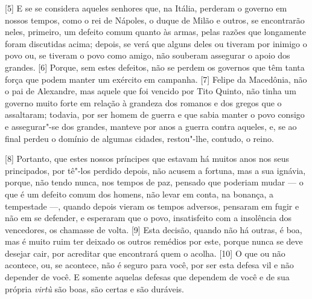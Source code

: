 {[}5{]} E se se considera aqueles senhores que, na Itália, perderam o
governo em nossos tempos, como o rei de Nápoles, o duque de Milão e outros,
se encontrarão neles, primeiro, um defeito comum quanto às armas, pelas
razões que longamente foram discutidas acima; depois, se verá que alguns
deles ou tiveram por inimigo o povo ou, se tiveram o povo como amigo,
não souberam assegurar o apoio dos grandes. {[}6{]} Porque, sem estes
defeitos, não se perdem os governos que têm tanta força que podem manter
um exército em campanha. {[}7{]} Felipe da Macedônia, não o pai de Alexandre, mas aquele que foi vencido por
Tito Quinto, não tinha um governo muito forte em relação à grandeza dos
romanos e dos gregos que o assaltaram; todavia, por ser homem de guerra
e que sabia manter o povo consigo e assegurar"-se dos grandes, manteve
por anos a guerra contra aqueles, e, se ao final perdeu o domínio de
algumas cidades, restou"-lhe, contudo, o reino.

{[}8{]} Portanto, que estes nossos príncipes que estavam há muitos anos
nos seus principados, por tê"-los perdido depois, não acusem a fortuna,
mas a sua ignávia, porque, não tendo nunca, nos tempos de paz, pensado
que poderiam mudar --- o que é um defeito comum dos homens, não levar em
conta, na bonança, a tempestade ---, quando depois vieram os tempos
adversos, pensaram em fugir e não em se defender, e esperaram que o
povo, insatisfeito com a insolência dos vencedores, os chamasse de
volta. {[}9{]} Esta decisão, quando não há outras, é boa, mas é muito
ruim ter deixado os outros remédios por este, porque nunca se deve
desejar cair, por acreditar que encontrará quem o acolha. {[}10{]} O que
ou não acontece, ou, se acontece, não é seguro para você, por ser esta
defesa vil e não depender de você. E somente aquelas defesas que
dependem de você e de sua própria \emph{virtù} são boas, são certas e
são duráveis.


